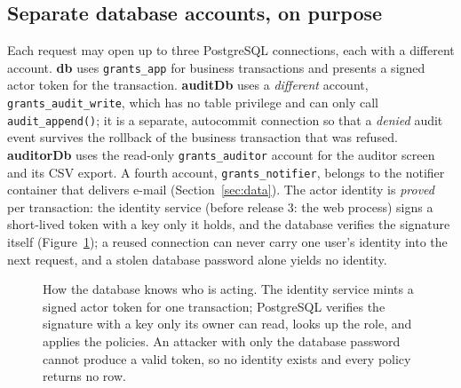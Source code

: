 \documentclass[10pt,a4paper]{article}
\newcommand{\code}[1]{\nolinkurl{#1}}
\newcommand{\diagram}[3]{\begin{figure}[!htbp]\centering\adjustbox{max width=\linewidth,max height=6.6cm}{}\caption{#2}\label{fig:#3}\end{figure}}
\begin{document}
\subsection{Separate database accounts, on purpose}
Each request may open up to three PostgreSQL connections, each with a different account. \textbf{db} uses \code{grants_app} for business transactions and presents a signed actor token for the transaction. \textbf{auditDb} uses a \emph{different} account, \code{grants_audit_write}, which has no table privilege and can only call \code{audit_append()}; it is a separate, autocommit connection so that a \emph{denied} audit event survives the rollback of the business transaction that was refused. \textbf{auditorDb} uses the read-only \code{grants_auditor} account for the auditor screen and its CSV export. A fourth account, \code{grants_notifier}, belongs to the notifier container that delivers e-mail (Section~\ref{sec:data}). The actor identity is \emph{proved} per transaction: the identity service (before release 3: the web process) signs a short-lived token with a key only it holds, and the database verifies the signature itself (Figure~\ref{fig:identity}); a reused connection can never carry one user's identity into the next request, and a stolen database password alone yields no identity.
\diagram{identity}{How the database knows who is acting. The identity service mints a signed actor token for one transaction; PostgreSQL verifies the signature with a key only its owner can read, looks up the role, and applies the policies. An attacker with only the database password cannot produce a valid token, so no identity exists and every policy returns no row.}{identity}
\end{document}
